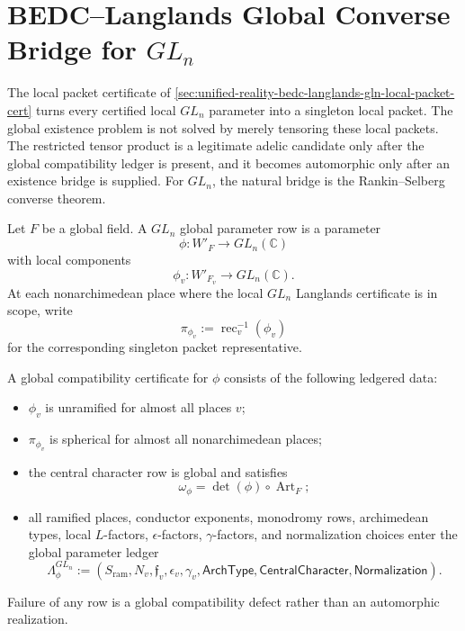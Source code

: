 \section{BEDC--Langlands Global Converse Bridge for $GL_n$}
\label{sec:unified-reality-bedc-langlands-gln-global-converse-bridge}

The local packet certificate of
\autoref{sec:unified-reality-bedc-langlands-gln-local-packet-cert}
turns every certified local $GL_n$ parameter into a singleton local
packet. The global existence problem is not solved by merely tensoring
these local packets. The restricted tensor product is a legitimate
adelic candidate only after the global compatibility ledger is present,
and it becomes automorphic only after an existence bridge is supplied.
For $GL_n$, the natural bridge is the Rankin--Selberg converse theorem.

\begin{definition}
\label{def:unified-reality-gln-global-parameter-row}
Let $F$ be a global field. A $GL_n$ global parameter row is a parameter
$$
\phi:W'_F\to GL_n(\mathbb C)
$$
with local components
$$
\phi_v:W'_{F_v}\to GL_n(\mathbb C).
$$
At each nonarchimedean place where the local $GL_n$ Langlands
certificate is in scope, write
$$
\pi_{\phi_v}:=\operatorname{rec}_v^{-1}(\phi_v)
$$
for the corresponding singleton packet representative.
\end{definition}

\begin{definition}
\label{def:unified-reality-gln-global-compatibility-cert}
A global compatibility certificate for $\phi$ consists of the following
ledgered data:
\begin{itemize}
\item $\phi_v$ is unramified for almost all places $v$;
\item $\pi_{\phi_v}$ is spherical for almost all nonarchimedean places;
\item the central character row is global and satisfies
$$
\omega_{\phi}
=
\det(\phi)\circ\operatorname{Art}_F;
$$
\item all ramified places, conductor exponents, monodromy rows,
archimedean types, local $L$-factors, $\epsilon$-factors,
$\gamma$-factors, and normalization choices enter the global parameter
ledger
$$
\Lambda_{\phi}^{GL_n}
:=
(S_{\mathrm{ram}},N_v,\mathfrak f_v,\epsilon_v,\gamma_v,
\mathsf{ArchType},\mathsf{CentralCharacter},\mathsf{Normalization}).
$$
\end{itemize}
Failure of any row is a global compatibility defect rather than an
automorphic realization.
\end{definition}

